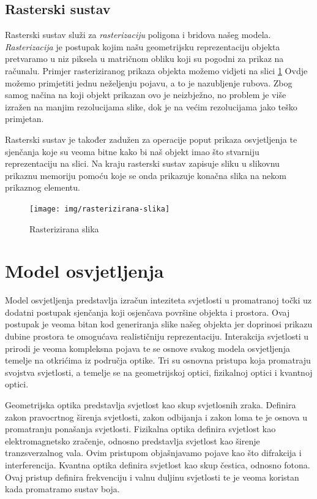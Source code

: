 \documentclass[times, utf8, diplomskirad]{fer}
\begin{document}
\subsection{Rasterski sustav}
Rasterski sustav služi za \textit{rasterizaciju} poligona i bridova našeg modela.
\textit{Rasterizacija} je postupak kojim našu geometrijsku reprezentaciju objekta pretvaramo u niz piksela u matričnom obliku koji su pogodni za prikaz na računalu.
Primjer rasteriziranog prikaza objekta možemo vidjeti na slici \ref{fig:rasterizirana-slika}
Ovdje možemo primjetiti jednu neželjenju pojavu, a to je nazubljenje rubova.
Zbog samog načina na koji objekt prikazan ovo je neizbježno, no problem je više izražen na manjim rezolucijama slike, dok je na većim rezolucijama jako teško primjetan.

Rasterski sustav je također zadužen za operacije poput prikaza osvjetljenja te sjenčanja koje su veoma bitne kako bi naš objekt imao što stvarniju reprezentaciju na slici.
Na kraju rasterski sustav zapisuje sliku u slikovnu prikaznu memoriju pomoću koje se onda prikazuje konačna slika na nekom prikaznog elementu.

\begin{figure}[H]
    \centering
    \texttt{[image: img/rasterizirana-slika]}
    \caption{Rasterizirana slika}
    \label{fig:rasterizirana-slika}
\end{figure}

\section{Model osvjetljenja}
Model osvjetljenja predstavlja izračun inteziteta svjetlosti u promatranoj točki uz dodatni postupak sjenčanja koji osjenčava površine objekta i prostora.
Ovaj postupak je veoma bitan kod generiranja slike našeg objekta jer doprinosi prikazu dubine prostora te omogućava realističniju reprezentaciju.
Interakcija svjetlosti u prirodi je veoma kompleksna pojava te se osnove svakog modela osvjetljenja temelje na otkrićima iz područja optike.
Tri su osnovna pristupa koja promatraju svojstva svjetlosti, a temelje se na geometrijskoj optici, fizikalnoj optici i kvantnoj optici.

Geometrijska optika predstavlja svjetlost kao skup svjetlosnih zraka.
Definira zakon pravocrtnog širenja svjetlosti, zakon odbijanja i zakon loma te je osnova u promatranju ponašanja svjetlosti.
Fizikalna optika definira svjetlost kao elektromagnetsko zračenje, odnosno predstavlja svjetlost kao širenje tranzsverzalnog vala.
Ovim pristupom objašnjavamo pojave kao što difrakcija i interferencija.
Kvantna optika definira svjetlost kao skup čestica, odnosno fotona.
Ovaj pristup definira frekvenciju i valnu duljinu svjetlosti te je veoma koristan kada promatramo sustav boja.
\end{document}
